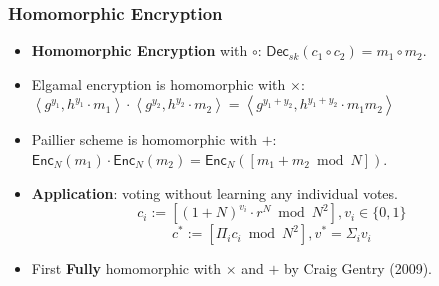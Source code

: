 \begin{frame}\frametitle{Homomorphic Encryption}
\begin{itemize}
\item \textbf{Homomorphic Encryption} with $\circ$: $\mathsf{Dec}_{sk}(c_1\circ c_2)=m_1\circ m_2$.
\item Elgamal encryption is homomorphic with $\times$: $\left<g^{y_1},h^{y_1}\cdot m_1\right>\cdot \left<g^{y_2},h^{y_2}\cdot m_2\right> = \left<g^{y_1+y_2},h^{y_1+y_2}\cdot m_1m_2\right>$
\item Paillier scheme is homomorphic with $+$: $\mathsf{Enc}_N(m_1) \cdot \mathsf{Enc}_N(m_2) = \mathsf{Enc}_N([m_1+m_2 \bmod N])$.
\item \textbf{Application}: voting without learning any individual votes.
\[c_i := [(1+N)^{v_i}\cdot r^N \bmod N^2], v_i \in \{0,1\}\]
\[c^* := [\Pi_{i} c_i \bmod N^2], v^* = \Sigma_{i} v_i \]
\item First \textbf{Fully} homomorphic with $\times$ and $+$ by Craig Gentry (2009).
\end{itemize}
\end{frame}
